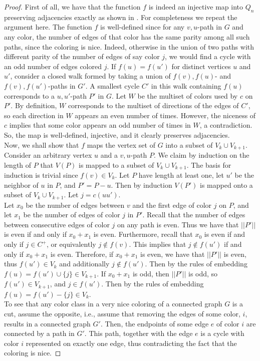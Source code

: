 \documentclass[11pt, a4paper]{article}
\begin{document}
\begin{proof}
	
	 First of all, we have that the function $f$  is indeed an injective map into $Q_n$ preserving adjacencies exactly as  shown in  \cite{HM}. For completeness we repeat the argument here. The function $f$  is well-defined since for any $v,u$-path in $G$ and any color, the number of edges of that color has the same parity  among all such paths, since the coloring is nice.  Indeed, otherwise in the union of two paths with different parity of the number of edges of say color $j$, we would find a cycle with an odd number of edges colored $j$.   If $f(u)=f(u')$ for distinct vertices $u$ and $u'$,  consider a closed walk formed by taking a union of $f(v),f(u)$- and $f(v),f(u')$-paths in $G'$. A smallest cycle $C'$ in this walk containing $f(u)$ corresponds to a $u,u'$-path $P'$  in $G$. Let $W$ be the multiset of colors used by $c$ on $P'$.  By definition, $W$ corresponds to the multiset of directions of the edges of $C'$, so each direction in $W$ appears an even number of times.  However, the niceness of $c$ implies that  some color appears an odd number of times in $W$, a contradiction.
	So, the map is well-defined, injective, and it  clearly preserves adjacencies.\\
	
	
	
	Now, we shall show that $f$ maps the vertex set of $G$ into a subset of  $V_k \cup V_{k+1}$.  
	Consider an arbitrary vertex $u$ and a $v,u$-path $P$.  We claim by induction on the length of $P$ that $V(P)$ is mapped to a subset of $ V_k \cup V_{k+1}$. The basis for induction is trivial since $f(v)\in V_k$.  Let $P$ have length at least one, let $u'$ be the neighbor of $u$ in $P$,  and $P'=P-u$. Then by induction $V(P')$ is mapped onto a subset of $V_k\cup V_{k+1}$.  Let $j=c(uu')$.\\
	

Let $x_0$ be the number of edges between $v$ and the first edge of color $j$ on $P$, and let $x_1$ be the number of edges of color $j$ in $P'$.
Recall that  the number of edges between consecutive edges of color $j$ on any path is even. Thus we have that $||P'||$ is even if and only if $x_0 + x_1$ is even.
Furthermore, recall that $x_0$ is even if and only if $j\in C^+$, or equivalently $j\not\in f(v)$.
This implies that $j\not\in f(u')$ if and only if $x_0+x_1$ is even.
Therefore, if $x_0 + x_1$ is even, we have that $||P'||$ is even, thus $f(u')\in V_k$ and additionally $j\not\in f(u')$. Then by the rules of embedding $f(u) = f(u') \cup \{j\} \in V_{k+1}$. 
If $x_0+x_1$ is odd, then $||P'||$ is odd, so $f(u')\in V_{k+1}$, and $j\in f(u')$. Then by the rules of embedding $f(u) = f(u') -\{j\} \in V_{k}$.\\
 	


To see that any color class in a very nice coloring of a connected graph $G$ is a cut, assume the opposite, i.e., assume that removing the edges of some color, $i$,  results in a connected graph $G'$. Then, the endpoints of some edge $e$ of color $i$ are connected by a path in $G'$. This path, together with the edge $e$ is a cycle with color $i$ represented on exactly one edge, thus contradicting the fact that the coloring is nice.
	\end{proof}
\end{document}
